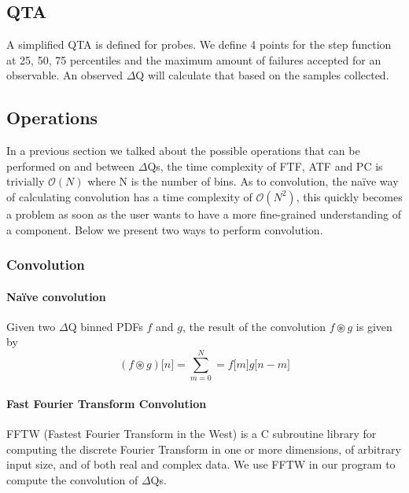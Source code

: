     \subsection{QTA}
        A simplified QTA is defined for probes. We define 4 points for the step function at 25, 50, 75 percentiles and the maximum amount of failures accepted for an observable. An observed $\Delta$Q will calculate that based on the samples collected. 

    \subsection{Operations}
    In a previous section we talked about the possible operations that can be performed on and between $\Delta$Qs, the time complexity of FTF, ATF and PC is trivially $\mathcal{O}(N)$ where N is the number of bins. As to convolution, the naïve way of calculating convolution has a time complexity of $\mathcal{O}(N^2)$, this quickly becomes a problem as soon as the user wants to have a more fine-grained understanding of a component. Below we present two ways to perform convolution.

        \subsubsection{Convolution}
        
        \paragraph{Naïve convolution}
        Given two $\Delta$Q binned PDFs $f$ and $g$, the result of the convolution $f \circledast g$ is given by 
        \begin{equation}
            (f \circledast g)\lbrack n \rbrack = \sum_{m = 0}^{N} = f\lbrack m \rbrack g \lbrack n - m \rbrack  
            \label{eq:discconv}
        \end{equation}
 
    \paragraph{Fast Fourier Transform Convolution}
        FFTW (Fastest Fourier Transform in the West) is a C subroutine library \cite{fftw3} for computing the discrete Fourier Transform in one or more dimensions, of arbitrary input size, and of both real and complex data. We use FFTW in our program to compute the convolution of $\Delta$Qs.
    
